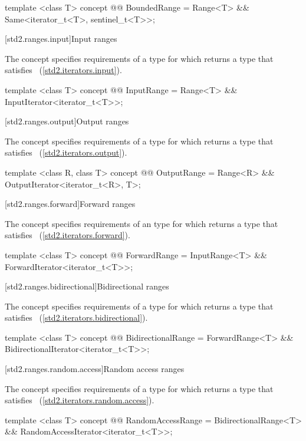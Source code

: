 \begin{codeblock}
template <class T>
concept @@ BoundedRange =
  Range<T> && Same<iterator_t<T>, sentinel_t<T>>;
\end{codeblock}

[std2.ranges.input]{Input ranges}

\pnum
The  concept specifies requirements of
a  type for which  returns a type
that satisfies ~(\ref{std2.iterators.input}).

\begin{codeblock}
template <class T>
concept @@ InputRange =
  Range<T> && InputIterator<iterator_t<T>>;
\end{codeblock}

[std2.ranges.output]{Output ranges}

\pnum
The  concept specifies requirements of
a  type for which  returns a type that satisfies
~(\ref{std2.iterators.output}).

\begin{codeblock}
template <class R, class T>
concept @@ OutputRange =
  Range<R> && OutputIterator<iterator_t<R>, T>;
\end{codeblock}

[std2.ranges.forward]{Forward ranges}

\pnum
The  concept specifies requirements of an
 type for which  returns a type that satisfies
~(\ref{std2.iterators.forward}).

\begin{codeblock}
template <class T>
concept @@ ForwardRange =
  InputRange<T> && ForwardIterator<iterator_t<T>>;
\end{codeblock}

[std2.ranges.bidirectional]{Bidirectional ranges}

\pnum
The  concept specifies requirements of a
 type for which  returns a type that satisfies
~(\ref{std2.iterators.bidirectional}).

\begin{codeblock}
template <class T>
concept @@ BidirectionalRange =
  ForwardRange<T> && BidirectionalIterator<iterator_t<T>>;
\end{codeblock}

[std2.ranges.random.access]{Random access ranges}

\pnum
The  concept specifies requirements of a
 type for which  returns a type that satisfies
~(\ref{std2.iterators.random.access}).

\begin{codeblock}
template <class T>
concept @@ RandomAccessRange =
  BidirectionalRange<T> && RandomAccessIterator<iterator_t<T>>;
\end{codeblock}
